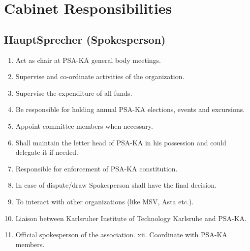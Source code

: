 \section{Cabinet Responsibilities }
\subsection{HauptSprecher (Spokesperson) }
\begin{enumerate}
	\item Act as chair at PSA-KA general body meetings. 
	\item Supervise and co-ordinate activities of the organization. 
	\item Supervise the expenditure of all funds. 
	\item Be responsible for holding annual PSA-KA elections, events and excursions. 
	\item Appoint committee members when necessary. 
	\item Shall maintain the letter head of PSA-KA in his possession and could delegate it if needed. 
	\item Responsible for enforcement of PSA-KA constitution. 
	\item In case of dispute/draw Spokesperson shall have the final decision. 
	\item To interact with other organizations (like MSV, Asta etc.). 
	\item Liaison between Karlsruher Institute of Technology Karlsruhe and PSA-KA. 
	\item Official spokesperson of the association. xii. Coordinate with PSA-KA members. 
\end{enumerate}
